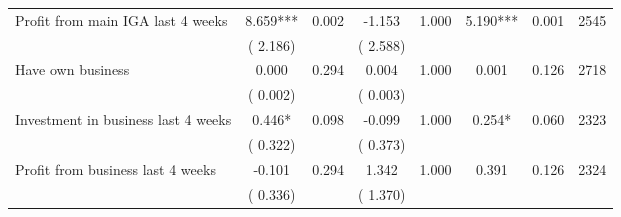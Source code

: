 \begin{tabular}{l*{7}{c}}
 Profit from main IGA last 4 weeks       &              8.659***       &        0.002  &             -1.153       &        1.000  &              5.190***       &              0.001 &  2545 \\ 
                       &       (       2.186)             &                               &       (       2.588)                     &                               &                                               &                                &                      \\ 

 Have own business       &              0.000       &        0.294  &              0.004       &        1.000  &              0.001       &              0.126 &  2718 \\ 
                       &       (       0.002)             &                               &       (       0.003)                     &                               &                                               &                                &                      \\ 

 Investment in business last 4 weeks       &              0.446*       &        0.098  &             -0.099       &        1.000  &              0.254*       &              0.060 &  2323 \\ 
                       &       (       0.322)             &                               &       (       0.373)                     &                               &                                               &                                &                      \\ 

 Profit from business last 4 weeks       &             -0.101       &        0.294  &              1.342       &        1.000  &              0.391       &              0.126 &  2324 \\ 
                       &       (       0.336)             &                               &       (       1.370)                     &                               &                                               &                                &                      \\ 

\hline \end{tabular}